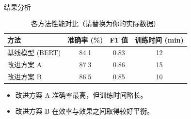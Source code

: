 \documentclass[aspectratio=169]{beamer}
\begin{document}
\begin{frame}{结果分析}
  \begin{table}
    \centering
    \begin{tabular}{lccc}
      \toprule
      \textbf{方法} & \textbf{准确率 (\%)} & \textbf{F1 值} & \textbf{训练时间 (min)} \\
      \midrule
      基线模型 (BERT)    & 84.1 & 0.83 & 12 \\
      改进方案 A        & 87.3 & 0.86 & 15 \\
      改进方案 B        & 86.5 & 0.85 & 10 \\
      \bottomrule
    \end{tabular}
    \caption{各方法性能对比（请替换为你的实际数据）}
    \label{tab:result-compare}
  \end{table}

  \begin{itemize}
    \item 改进方案 A 准确率最高，但训练时间略长。
    \item 改进方案 B 在效率与效果之间取得较好平衡。
  \end{itemize}
\end{frame}


%
\end{document}
